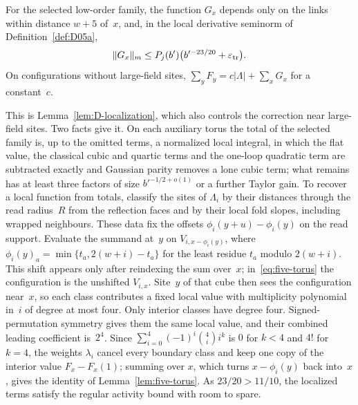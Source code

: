 \begin{lemma}\label{lem:five-torus}
For the selected low-order family, the function $G_x$ depends only on the links within distance $w+5$ of~$x$, and, in the local derivative seminorm of Definition~\ref{def:D05a},
\begin{equation*}
\|G_x\|_m\le P_j(b')\bigl(b'^{-23/20}+\varepsilon_{\rm tr}\bigr).
\end{equation*}
On configurations without large-field sites, $\sum_yF_y=c|\Lambda|+\sum_xG_x$ for a constant~$c$.
\end{lemma}

This is Lemma~\ref{lem:D-localization}, which also controls the correction near large-field sites. Two facts give it. On each auxiliary torus the total of the selected family is, up to the omitted terms, a normalized local integral, in which the flat value, the classical cubic and quartic terms and the one-loop quadratic term are subtracted exactly and Gaussian parity removes a lone cubic term; what remains has at least three factors of size $b'^{-1/2+o(1)}$ or a further Taylor gain. To recover a local function from totals, classify the sites of $\Lambda_i$ by their distances through the read radius~$R$ from the reflection faces and by their local fold slopes, including wrapped neighbours. These data fix the offsets $\phi_i(y+u)-\phi_i(y)$ on the read support. Evaluate the summand at~$y$ on $V_{i,x-\phi_i(y)}$, where $\phi_i(y)_a=\min\{t_a,2(w+i)-t_a\}$ for the least residue $t_a$ modulo $2(w+i)$. This shift appears only after reindexing the sum over~$x$; in~\eqref{eq:five-torus} the configuration is the unshifted $V_{i,x}$. Site~$y$ of that cube then sees the configuration near~$x$, so each class contributes a fixed local value with multiplicity polynomial in~$i$ of degree at most four. Only interior classes have degree four. Signed-permutation symmetry gives them the same local value, and their combined leading coefficient is~$2^4$. Since $\sum_{i=0}^4(-1)^i\binom4ii^k$ is $0$ for $k<4$ and $4!$ for $k=4$, the weights $\lambda_i$ cancel every boundary class and keep one copy of the interior value $F_x-F_x(1)$; summing over $x$, which turns $x-\phi_i(y)$ back into~$x$, gives the identity of Lemma~\ref{lem:five-torus}. As $23/20>11/10$, the localized terms satisfy the regular activity bound with room to spare.

